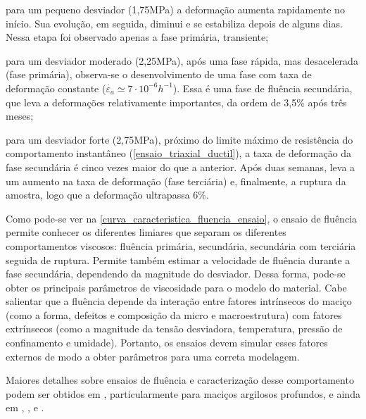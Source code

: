 \begin{alineas}
	
	\item para um pequeno desviador (1,75MPa) a deformação aumenta rapidamente no início. Sua evolução, em seguida, diminui e se estabiliza depois de alguns dias. Nessa etapa foi observado apenas a fase primária, transiente;
	
	\item para um desviador moderado (2,25MPa), após uma fase rápida, mas desacelerada (fase primária), observa-se o desenvolvimento de uma fase com taxa de deformação constante ($\dot{\varepsilon_a}\simeq 7\cdot {{10}^{-6}}{{h}^{-1}}$). Essa é uma fase de fluência secundária, que leva a deformações relativamente importantes, da ordem de 3,5\% após três meses;
	
	\item para um desviador forte (2,75MPa), próximo do limite máximo de resistência do comportamento instantâneo (\autoref{ensaio_triaxial_ductil}), a taxa de deformação da fase secundária é cinco vezes maior do que a anterior. Após duas semanas, leva a um aumento na taxa de deformação (fase terciária) e, finalmente, a ruptura da amostra, logo que a deformação ultrapassa 6\%.
	
\end{alineas}

Como pode-se ver na \autoref{curva_caracteristica_fluencia_ensaio}, o ensaio de fluência permite conhecer os diferentes limiares que separam os diferentes comportamentos viscosos: fluência primária, secundária, secundária com terciária seguida de ruptura. Permite também estimar a velocidade de fluência durante a fase secundária, dependendo da magnitude do desviador. Dessa forma, pode-se obter os principais parâmetros de viscosidade para o modelo do material. Cabe salientar que a fluência depende da interação entre fatores intrínsecos do maciço (como a forma, defeitos e composição da micro e macroestrutura) com fatores extrínsecos (como a magnitude da tensão desviadora, temperatura, pressão de confinamento e umidade). Portanto, os ensaios devem simular esses fatores externos de modo a obter parâmetros para uma correta modelagem.

Maiores detalhes sobre ensaios de fluência e caracterização desse comportamento podem ser obtidos em , particularmente para maciços argilosos profundos, e ainda em , ,  e .

